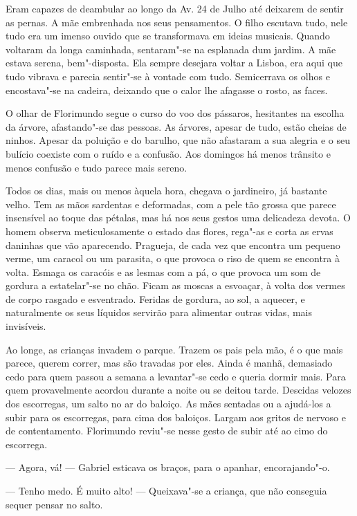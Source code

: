 Eram capazes de deambular ao longo da Av. 24 de Julho até deixarem de
sentir as pernas. A mãe embrenhada nos seus pensamentos. O filho
escutava tudo, nele tudo era um imenso ouvido que se transformava em
ideias musicais. Quando voltaram da longa caminhada, sentaram"-se na
esplanada dum jardim. A mãe estava serena, bem"-disposta. Ela sempre
desejara voltar a Lisboa, era aqui que tudo vibrava e parecia sentir"-se
à vontade com tudo. Semicerrava os olhos e encostava"-se na cadeira,
deixando que o calor lhe afagasse o rosto, as faces.

O olhar de Florimundo segue o curso do voo dos pássaros, hesitantes na
escolha da árvore, afastando"-se das pessoas. As árvores, apesar de tudo,
estão cheias de ninhos. Apesar da poluição e do barulho, que não
afastaram a sua alegria e o seu bulício coexiste com o ruído e a
confusão. Aos domingos há menos trânsito e menos confusão e tudo parece
mais sereno.

Todos os dias, mais ou menos àquela hora, chegava o jardineiro, já
bastante velho. Tem as mãos sardentas e deformadas, com a pele tão
grossa que parece insensível ao toque das pétalas, mas há nos seus
gestos uma delicadeza devota. O homem observa meticulosamente o estado
das flores, rega"-as e corta as ervas daninhas que vão aparecendo.
Pragueja, de cada vez que encontra um pequeno verme, um caracol ou um
parasita, o que provoca o riso de quem se encontra à volta. Esmaga os
caracóis e as lesmas com a pá, o que provoca um som de gordura a
estatelar"-se no chão. Ficam as moscas a esvoaçar, à volta dos vermes de
corpo rasgado e esventrado. Feridas de gordura, ao sol, a aquecer, e
naturalmente os seus líquidos servirão para alimentar outras vidas, mais
invisíveis.

Ao longe, as crianças invadem o parque. Trazem os pais pela mão, é o que
mais parece, querem correr, mas são travadas por eles. Ainda é manhã,
demasiado cedo para quem passou a semana a levantar"-se cedo e queria
dormir mais. Para quem provavelmente acordou durante a noite ou se
deitou tarde. Descidas velozes dos escorregas, um salto no ar do
baloiço. As mães sentadas ou a ajudá-los a subir para os escorregas,
para cima dos baloiços. Largam aos gritos de nervoso e de contentamento.
Florimundo reviu"-se nesse gesto de subir até ao cimo do escorrega.

--- Agora, vá! --- Gabriel esticava os braços, para o apanhar,
encorajando"-o.

--- Tenho medo. É muito alto! --- Queixava"-se a criança, que não conseguia
sequer pensar no salto.

